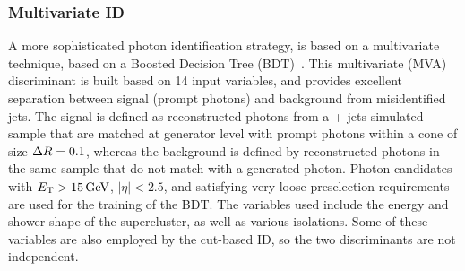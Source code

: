 


\subsubsection{Multivariate ID}
A more sophisticated photon identification strategy, is based on a multivariate technique, based on a Boosted Decision Tree (BDT)~\cite{CMS-EGM-17-001}.
This multivariate (MVA) discriminant is built based on 14 input variables,
and provides excellent separation between signal (prompt photons) and background from misidentified jets.
The signal is defined as reconstructed photons from a \PGg + jets simulated sample that are matched at generator level with prompt photons within a cone of size $\Delta R = 0.1$,
whereas the background is defined by reconstructed photons in the same sample that do not match with a generated photon.
Photon candidates with $E_{\mathrm{T}} > 15 \,\text{Ge\hspace{-.08em}V}$, $|\eta| < 2.5$, and satisfying very loose preselection requirements are used for the training of the BDT.
The variables used include the energy and shower shape of the supercluster, as well as various isolations.
Some of these variables are also employed by the cut-based ID, so the two discriminants are not independent.

